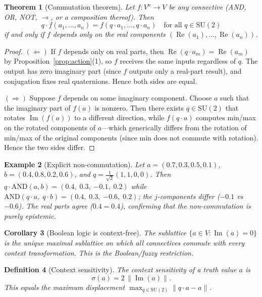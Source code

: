 \documentclass[11pt,a4paper]{article}
\newtheorem{theorem}{Theorem}
\newtheorem{corollary}[theorem]{Corollary}
\newtheorem{definition}[theorem]{Definition}
\newtheorem{example}[theorem]{Example}
\newcommand{\Real}{\operatorname{Re}}
\newcommand{\Imag}{\operatorname{Im}}
\newcommand{\SU}{\mathrm{SU}(2)}
\begin{document}
\begin{theorem}[Commutation theorem]
\label{thm:commutation}
Let $f:V^n\to V$ be any connective (AND, OR, NOT, $\to$, or a
composition thereof). Then
\[
  q\cdot f(a_1,\ldots,a_n)=f(q\cdot a_1,\ldots,q\cdot a_n)
  \quad\text{for all } q\in\SU
\]
if and only if $f$ depends only on the real components
$(\Real(a_1),\ldots,\Real(a_n))$.
\end{theorem}

\begin{proof}
$(\Leftarrow)$ If $f$ depends only on real parts, then
$\Real(q\cdot a_m)=\Real(a_m)$ by Proposition~\ref{prop:action}(1),
so $f$ receives the same inputs regardless of $q$. The output has
zero imaginary part (since $f$ outputs only a real-part result),
and conjugation fixes real quaternions. Hence both sides are equal.

$(\Rightarrow)$ Suppose $f$ depends on some imaginary component.
Choose $a$ such that the imaginary part of $f(a)$ is nonzero. Then
there exists $q\in\SU$ that rotates $\Imag(f(a))$ to a different
direction, while $f(q\cdot a)$ computes min/max on the rotated
components of $a$---which generically differs from the rotation of
min/max of the original components (since min does not commute with
rotation). Hence the two sides differ.
\end{proof}

\begin{example}[Explicit non-commutation]
\label{ex:noncommute}
Let $a=(0.7,0.3,0.5,0.1)$, $b=(0.4,0.8,0.2,0.6)$, and
$q=\tfrac{1}{\sqrt{2}}(1,1,0,0)$.
Then $q\cdot\mathrm{AND}(a,b)=(0.4,\;0.3,\;{-0.1},\;0.2)$ while
$\mathrm{AND}(q\cdot a,\;q\cdot b)=(0.4,\;0.3,\;{-0.6},\;0.2)$;
the $j$-components differ ($-0.1$ vs $-0.6$).
The real parts agree ($0.4=0.4$), confirming that the
non-commutation is purely epistemic.
\end{example}

\begin{corollary}[Boolean logic is context-free]
\label{cor:boolean}
The sublattice $\{a\in V:\Imag(a)=0\}$ is the unique maximal
sublattice on which all connectives commute with every context
transformation. This is the Boolean/fuzzy restriction.
\end{corollary}

\begin{definition}[Context sensitivity]
\label{def:sensitivity}
The \emph{context sensitivity} of a truth value $a$ is
\[
  \sigma(a) = 2\,\|\Imag(a)\|.
\]
This equals the maximum displacement $\max_{q\in\SU}\|q\cdot a - a\|$.
\end{definition}
\end{document}
